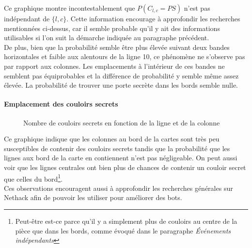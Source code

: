 \documentclass[a4paper,12pt]{article}
\begin{document}
Ce graphique montre incontestablement que $P(C_{l,c} = PS)$ n'est pas indépendant
de $\{l,c\}$. Cette information encourage à approfondir les recherches
mentionnées ci-dessus, car il semble probable qu'il y ait des informations
utilisables si l'on suit la démarche indiquée au paragraphe précédent.
\\
De plus, bien que la probabilité semble être plus élevée suivant deux bandes
horizontales et faible aux alentours de la ligne 10, ce phénomène ne s'observe
pas par rapport aux colonnes. Les emplacements à l'intérieur de ces bandes ne
semblent pas équiprobables et la différence de probabilité y semble même assez
élevée. La probabilité de trouver une porte secrète dans les bords semble nulle.

\paragraph{Emplacement des couloirs secrets}

\begin{figure}[H]
  \caption{\label{fig:3d_scorr_graph} Nombre de couloirs secrets en fonction
    de la ligne et de la colonne}
\end{figure}

Ce graphique indique que les colonnes au bord de la cartes sont très peu
susceptibles de contenir des couloirs secrets tandis que la probabilité que les
lignes aux bord de la carte en contiennent n'est pas négligeable. On peut aussi
voir que les lignes centrales ont bien plus de chances de contenir un couloir
secret que celles du bord\footnote{Peut-être est-ce parce qu'il y a simplement
plus de couloirs au centre de la pièce que dans les bords, comme évoqué dans le
paragraphe {\em Événements indépendants}}.
\\
Ces observations encouragent aussi à approfondir les recherches générales sur
Nethack afin de pouvoir les utiliser pour améliorer des bots.
\end{document}
